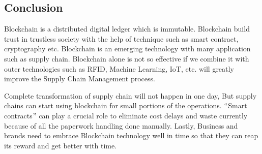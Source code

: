\documentclass[12pt]{article}
\begin{document}
\vspace{\baselineskip}



\newpage

\vspace{\baselineskip}\begin{Center}
\section*{Conclusion}
\end{Center}


{\fontsize{14pt}{16.8pt}\selectfont Blockchain is a distributed digital ledger which is immutable. Blockchain build trust in trustless society with the help of technique such as smart contract, cryptography etc. Blockchain is an emerging technology with many application such as supply chain. Blockchain alone is not so effective if we combine it with outer technologies such as RFID, Machine Learning, IoT, etc. will greatly improve the Supply Chain Management process.\par}\par

\begin{justify}
{\fontsize{14pt}{16.8pt}\selectfont Complete transformation of supply chain will not happen in one day, But supply chains can start using blockchain for small portions of the operations. $``$Smart contracts$"$  can play a crucial role to eliminate cost delays and waste currently because of all the paperwork handling done manually. Lastly, Business and brands need to embrace Blockchain technology well in time so that they can reap its reward and get better with time.\par}
\end{justify}\par


\vspace{\baselineskip}

\vspace{\baselineskip}

\vspace{\baselineskip}

\vspace{\baselineskip}

\vspace{\baselineskip}


\end{document}
